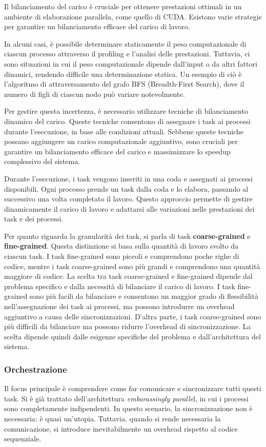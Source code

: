 Il bilanciamento del carico è cruciale per ottenere prestazioni ottimali in un ambiente di elaborazione parallela, come quello di CUDA. Esistono varie strategie per garantire un bilanciamento efficace del carico di lavoro.

In alcuni casi, è possibile determinare staticamente il peso computazionale di ciascun processo attraverso il profiling e l'analisi delle prestazioni. Tuttavia, ci sono situazioni in cui il peso computazionale dipende dall'input o da altri fattori dinamici, rendendo difficile una determinazione statica. Un esempio di ciò è l'algoritmo di attraversamento del grafo BFS (Breadth-First Search), dove il numero di figli di ciascun nodo può variare notevolmente.

Per gestire questa incertezza, è necessario utilizzare tecniche di bilanciamento dinamico del carico. Queste tecniche consentono di assegnare i task ai processi durante l'esecuzione, in base alle condizioni attuali. Sebbene queste tecniche possano aggiungere un carico computazionale aggiuntivo, sono cruciali per garantire un bilanciamento efficace del carico e massimizzare lo speedup complessivo del sistema.

Durante l'esecuzione, i task vengono inseriti in una coda e assegnati ai processi disponibili. Ogni processo prende un task dalla coda e lo elabora, passando al successivo una volta completato il lavoro. Questo approccio permette di gestire dinamicamente il carico di lavoro e adattarsi alle variazioni nelle prestazioni dei task e dei processi.

Per quanto riguarda la granularità dei task, si parla di task \textbf{coarse-grained} e \textbf{fine-grained}. Questa distinzione si basa sulla quantità di lavoro svolto da ciascun task. I task fine-grained sono piccoli e comprendono poche righe di codice, mentre i task coarse-grained sono più grandi e comprendono una quantità maggiore di codice. La scelta tra task coarse-grained e fine-grained dipende dal problema specifico e dalla necessità di bilanciare il carico di lavoro. I task fine-grained sono più facili da bilanciare e consentono un maggior grado di flessibilità nell'assegnazione dei task ai processi, ma possono introdurre un overhead aggiuntivo a causa delle sincronizzazioni. D'altra parte, i task coarse-grained sono più difficili da bilanciare ma possono ridurre l'overhead di sincronizzazione. La scelta dipende quindi dalle esigenze specifiche del problema e dall'architettura del sistema.
\subsubsection{Orchestrazione}
Il focus principale è comprendere come far comunicare e sincronizzare tutti questi task. Si è già trattato dell'architettura \textit{embarassingly paralle}l, in cui i processi sono completamente indipendenti. In questo scenario, la sincronizzazione non è necessaria: è quasi un'utopia. Tuttavia, quando si rende necessaria la comunicazione, si introduce inevitabilmente un overhead rispetto al codice sequenziale.